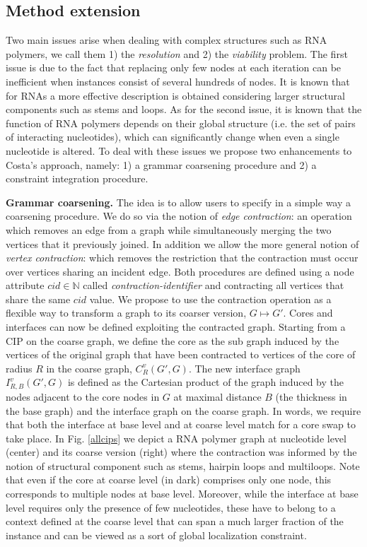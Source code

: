 \documentclass{article}
\newcommand*{\IN}[0]{\ensuremath{\mathbb{N}}}
\begin{document}
\subsection{Method extension}

Two main issues arise when dealing with complex structures such as RNA
polymers, we call them 1) the {\em resolution} and 2) the {\em viability}
problem. The first issue is due to the fact that replacing only few nodes at
each iteration can be inefficient when instances consist of several hundreds
of nodes. It is known that for RNAs a more effective description is obtained
considering larger structural components such as stems  and loops. As for the
second issue, it is known that the function of RNA polymers depends on their
global structure (i.e. the set of pairs of interacting nucleotides), which can
significantly change when even a single nucleotide is altered. To deal with
these issues we propose two enhancements to Costa's approach, namely: 1) a
grammar coarsening procedure and 2) a constraint integration procedure.


\textbf{Grammar coarsening.} The idea is to allow users to specify in a simple
way a coarsening procedure. We do so via the notion of {\em edge contraction}:
an operation which removes an edge from a graph while simultaneously merging
the two vertices that it previously joined. In addition we allow the more
general notion of {\em vertex contraction}: which removes the restriction that
the contraction must occur over vertices sharing an incident edge. Both
procedures are defined using a node attribute $cid \in \IN$ called {\em
contraction-identifier} and contracting all vertices that share the same $cid$
value. We propose to use the contraction operation as a flexible way to
transform a graph to its coarser version, $G \mapsto G'$. Cores and interfaces
can now be defined exploiting the contracted graph. Starting from a CIP on the
coarse graph, we define the core as the sub graph induced by the vertices of
the original graph that have been contracted to vertices of the core of radius
$R$ in the coarse graph, $C_R^v(G',G)$.  The new interface graph
$I_{R,B}^v(G',G)$ is defined as the Cartesian product of the graph induced by
the nodes adjacent to the core nodes in $G$ at maximal distance $B$ (the
thickness in the base graph) and the interface graph on the coarse graph. In
words, we require that both the interface at base level and at coarse level
match for a core swap to take place. In Fig. \ref{allcips}  we depict a RNA
polymer graph at nucleotide level (center) and its coarse version (right)
where the contraction was informed by the notion of structural component such
as stems, hairpin loops and multiloops. Note that even if the core at coarse
level (in dark) comprises only one node, this corresponds to multiple nodes at
base level. Moreover, while the interface at base level requires only the
presence of few nucleotides, these have to belong to a context defined at the
coarse level that can span a much larger fraction of the instance and can be
viewed as a sort of global localization constraint.
\end{document}
